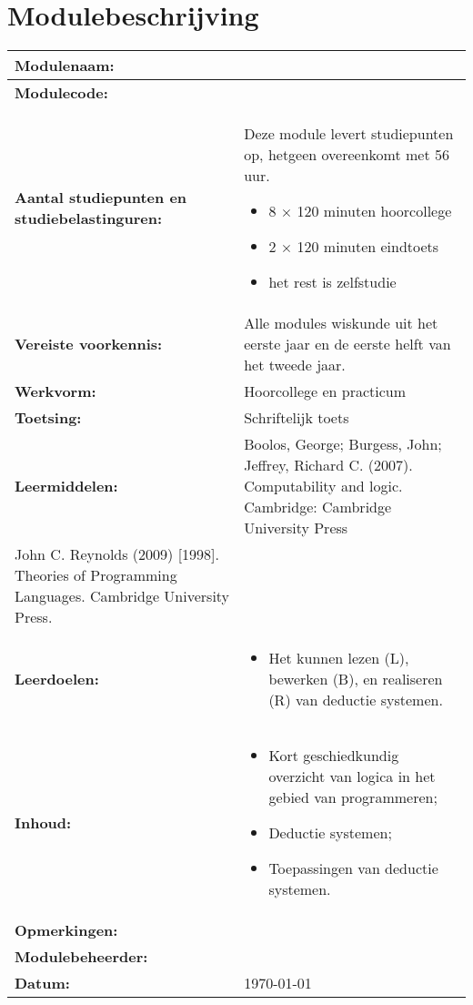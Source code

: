 \section*{Modulebeschrijving}
\begin{tabularx}{\textwidth}{|>{\columncolor{lichtGrijs}} p{}|X|}
	\hline
	\textbf{Modulenaam:} & \modulenaam\\
	\hline
	\textbf{Modulecode: }& \modulecode\\
	\hline
	\textbf{Aantal studiepunten \newline en studiebelastinguren:} & Deze module levert \stdPunten studiepunten op, hetgeen overeenkomt met 56 uur.
	\begin{itemize}
		\item 8 $\times$ 120 minuten hoorcollege
		\item 2 $\times$ 120 minuten eindtoets
		\item het rest is zelfstudie
	\end{itemize} \\
	\hline
	\textbf{Vereiste voorkennis:}&Alle modules wiskunde uit het eerste jaar en de eerste helft van het tweede jaar.\\
	\hline
	\textbf{Werkvorm:} & Hoorcollege en practicum \\
	\hline
	\textbf{Toetsing:} & Schriftelijk toets \\
	\hline
	\textbf{Leermiddelen:} & Boolos, George; Burgess, John; Jeffrey, Richard C. (2007). Computability and logic. Cambridge: Cambridge University Press \\
John C. Reynolds (2009) [1998]. Theories of Programming Languages. Cambridge University Press. \\
	\hline
	\textbf{Leerdoelen:}&
	\begin{itemize}
		\item Het kunnen lezen (L), bewerken (B), en realiseren (R) van deductie systemen.
	\end{itemize} \\
	\hline
	\textbf{Inhoud:}&
	\begin{itemize}
		\item Kort geschiedkundig overzicht van logica in het gebied van programmeren;
		\item Deductie systemen;
		\item Toepassingen van deductie systemen.
	\end{itemize}\\
	\hline
	\textbf{Opmerkingen:}&\\
	\hline
	\textbf{Modulebeheerder:} & \author\\
	\hline
	\textbf{Datum:} & \today \\
	\hline
\end{tabularx}
\newpage
